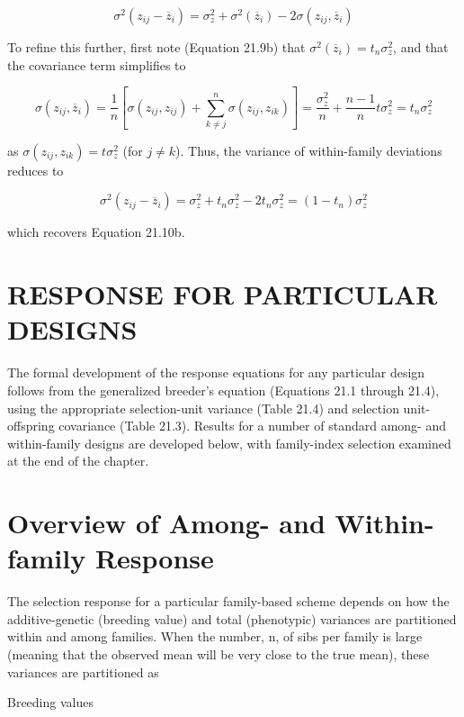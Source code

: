 \documentclass{article}
\begin{document}
\begin{equation}
\sigma^{2}(z_{i j}-\overline{{z}}_{i})=\sigma_{z}^{2}+\sigma^{2}(\overline{{z}}_{i})-2\sigma(z_{i j},\overline{{z}}_{i})
\end{equation}

To refine this further, first note (Equation 21.9b) that  $ \sigma^2(\overline{z}_i) = t_n \sigma_z^2 $, and that the covariance term simplifies to

\begin{equation}
\sigma(z_{ij},\overline{z}_{i})=\frac{1}{n}\left[\sigma(z_{ij},z_{ij})+\sum_{k\neq j}^{n}\sigma(z_{ij},z_{ik})\right]=\frac{\sigma_{z}^{2}}{n}+\frac{n-1}{n}t\sigma_{z}^{2}=t_{n}\sigma_{z}^{2}
\end{equation}

as  $ \sigma(z_{ij}, z_{ik}) = t\sigma_{z}^{2} $ (for  $ j \neq k $). Thus, the variance of within-family deviations reduces to

\begin{equation}
\sigma^{2}(z_{ij}-\overline{z}_{i})=\sigma_{z}^{2}+t_{n}\sigma_{z}^{2}-2t_{n}\sigma_{z}^{2}=\left(1-t_{n}\right)\sigma_{z}^{2}
\end{equation}

which recovers Equation 21.10b.

\section{RESPONSE FOR PARTICULAR DESIGNS}
The formal development of the response equations for any particular design follows from the generalized breeder's equation (Equations 21.1 through 21.4), using the appropriate selection-unit variance (Table 21.4) and selection unit-offspring covariance (Table 21.3). Results for a number of standard among- and within-family designs are developed below, with family-index selection examined at the end of the chapter.

\section{Overview of Among- and Within-family Response}
The selection response for a particular family-based scheme depends on how the additive-genetic (breeding value) and total (phenotypic) variances are partitioned within and among families. When the number, n, of sibs per family is large (meaning that the observed mean will be very close to the true mean), these variances are partitioned as

Breeding values
\end{document}
